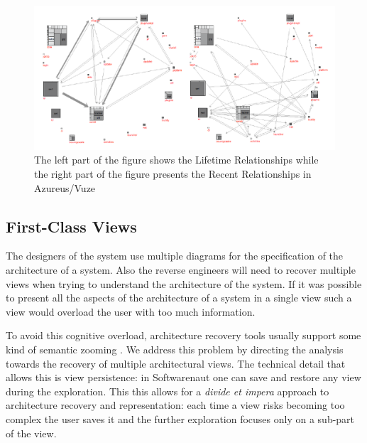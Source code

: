 \documentclass[preprint,12pt]{elsarticle}
\begin{document}
\begin{figure}[h]
\begin{center}
\includegraphics[width=\linewidth]{images/Architecture-LifetimeVsRecent}
\caption{The left part of the figure shows the Lifetime Relationships while the right part of the figure presents the Recent Relationships in Azureus/Vuze}
\end{center}
\end{figure}






\newpage
\subsection {First-Class Views}

The designers of the system use multiple diagrams for the specification of the architecture of a system. Also the reverse engineers will need to recover multiple views when trying to understand the architecture of the system. If it was possible to present all the aspects of the architecture of a system in a single view such a view would overload the user with too much information.

To avoid this cognitive overload, architecture recovery tools usually support some kind of semantic zooming \cite{storey-shrimp}. We address this problem by directing the analysis towards the recovery of multiple architectural views. The technical detail that allows this is view persistence: in Softwarenaut one can save and restore any view during the exploration. This this allows for a {\em divide et impera} approach to architecture recovery and representation: each time a view risks becoming too complex the user saves it and the further exploration focuses only on a sub-part of the view. 
\end{document}
